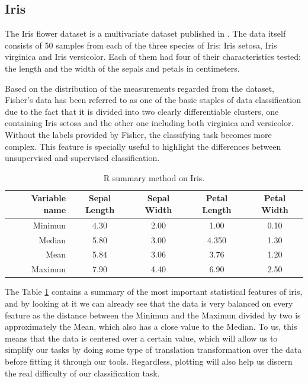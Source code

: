  

\subsection{Iris}

The Iris flower dataset is a multivariate dataset published in \cite{Fisher_Iris}. The data itself consists of 50 samples from each of the three species of Iris: Iris setosa, Iris virginica and Iris versicolor. Each of them had four of their characteristics tested: the length and the width of the sepals and petals in centimeters. \par

Based on the distribution of the measurements regarded from the dataset, Fisher's data has been referred to as one of the basic staples of data classification due to the fact that it is divided into two clearly differentiable clusters, one containing Iris setosa and the other one including both virginica and versicolor. Without the labels provided by Fisher, the classifying task becomes more complex. This feature is specially useful to highlight the differences between unsupervised and supervised classification.\newline

\begin{table}[H]
		\caption{R summary method on Iris.}
	\begin{center}
	\label{tab:table_Iris}
		\begin{tabular}{r|c|c|c|c} %
			\textbf{Variable name} & \textbf{Sepal Length} & \textbf{Sepal Width} & \textbf{Petal Length} & \textbf{Petal Width}\\
			\hline
			Minimun & 4.30 & 2.00 & 1.00 & 0.10\\
			Median & 5.80 & 3.00 & 4.350 & 1.30\\
			Mean & 5.84 & 3.06 & 3.76 & 1.20\\
			Maximun & 7.90 & 4.40 & 6.90 & 2.50\\
		\end{tabular}
	\end{center}
\end{table}

The Table \ref{tab:table_Iris} contains a summary of the most important statistical features of iris, and by looking at it we can already see that the data is very balanced on every feature as the distance between the Minimun and the Maximun divided by two is approximately the Mean, which also has a close value to the Median. To us, this means that the data is centered over a certain value, which will allow us to simplify our tasks by doing some type of translation transformation over the data before fitting it through our tools. Regardless, plotting will also help us discern the real difficulty of our classification task.

